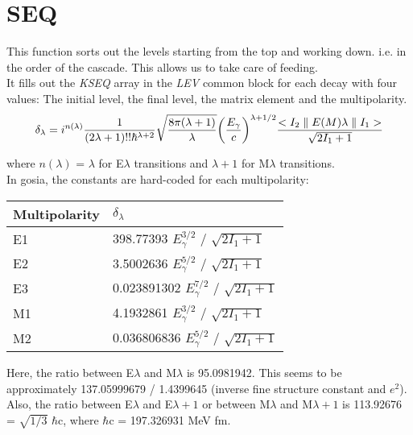 \section{SEQ}
\label{sect:seq}

\noindent This function sorts out the levels starting from the top and
working down. i.e. in the order of the cascade. This allows us to take care
of feeding.\\

\noindent It fills out the {\em KSEQ} array in the {\em LEV} common block
for each decay with four values: The initial level, the final level, the
matrix element and the multipolarity.\\

\begin{equation}
\delta_\lambda =
i^{n(\lambda)}
{1 \over (2 \lambda + 1)!! \hbar^{\lambda + 2}}
\sqrt{8 \pi (\lambda + 1) \over \lambda}
\bigg({E_\gamma \over c}\bigg)^{\lambda + 1/2}
{<I_2 \parallel E(M)\lambda \parallel I_1> \over \sqrt{2 I_1 + 1}}
\end{equation}

\noindent where $n(\lambda)$ = $\lambda$ for E$\lambda$ transitions and
$\lambda + 1$ for M$\lambda$ transitions.\\

\noindent In gosia, the constants are hard-coded for each multipolarity:\\

\begin{center}
\begin{tabular}{|ll|}
\hline
Multipolarity & $\delta_\lambda$\\
\hline
E1 & 398.77393 $E_\gamma^{3/2}$ / $\sqrt{2 I_1 + 1}$\\
E2 & 3.5002636 $E_\gamma^{5/2}$ / $\sqrt{2 I_1 + 1}$\\
E3 & 0.023891302 $E_\gamma^{7/2}$ / $\sqrt{2 I_1 + 1}$\\
M1 & 4.1932861 $E_\gamma^{3/2}$ / $\sqrt{2 I_1 + 1}$\\
M2 & 0.036806836 $E_\gamma^{5/2}$ / $\sqrt{2 I_1 + 1}$\\
\hline
\end{tabular}
\end{center}

\noindent Here, the ratio between E$\lambda$ and M$\lambda$ is 95.0981942.
This seems to be approximately 137.05999679 / 1.4399645 (inverse fine
structure constant and $e^2$).\\


\noindent Also, the ratio between E$\lambda$ and E$\lambda+1$ or between
M$\lambda$ and M$\lambda+1$ is 113.92676 = $\sqrt{1/3}$ $\hbar$c, where
$\hbar$c = 197.326931 MeV fm.\\

